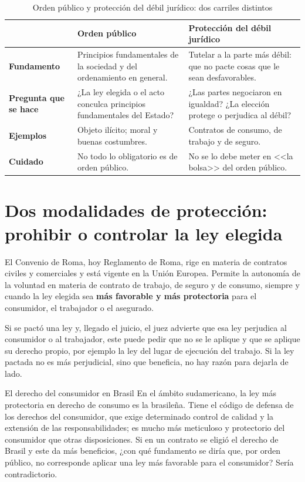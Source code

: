 \documentclass[12pt,oneside]{book}
\begin{document}
\begin{table}[H]
\centering
\caption{Orden p\'ublico y protecci\'on del d\'ebil jur\'idico: dos carriles distintos}
\small
\begin{tabularx}{\textwidth}{
    >{\raggedright\arraybackslash}p{}
    >{\raggedright\arraybackslash}X
    >{\raggedright\arraybackslash}X
}
\toprule
 & \textbf{Orden p\'ublico} & \textbf{Protecci\'on del d\'ebil jur\'idico} \\
\midrule
\textbf{Fundamento} & Principios fundamentales de la sociedad y del ordenamiento en general. & Tutelar a la parte m\'as d\'ebil: que no pacte cosas que le sean desfavorables. \\
\addlinespace
\textbf{Pregunta que se hace} & ¿La ley elegida o el acto conculca principios fundamentales del Estado? & ¿Las partes negociaron en igualdad? ¿La elecci\'on protege o perjudica al d\'ebil? \\
\addlinespace
\textbf{Ejemplos} & Objeto il\'icito; moral y buenas costumbres. & Contratos de consumo, de trabajo y de seguro. \\
\addlinespace
\textbf{Cuidado} & No todo lo obligatorio es de orden p\'ublico. & No se lo debe meter en <<la bolsa>> del orden p\'ublico. \\
\bottomrule
\end{tabularx}
\end{table}

\section{Dos modalidades de protecci\'on: prohibir o controlar la ley elegida}

El Convenio de Roma, hoy Reglamento de Roma, rige en materia de contratos civiles y comerciales y est\'a vigente en la Uni\'on Europea. Permite la autonom\'ia de la voluntad en materia de contrato de trabajo, de seguro y de consumo, siempre y cuando la ley elegida sea \textbf{m\'as favorable y m\'as protectoria} para el consumidor, el trabajador o el asegurado.

Si se pact\'o una ley y, llegado el juicio, el juez advierte que esa ley perjudica al consumidor o al trabajador, este puede pedir que no se le aplique y que se aplique su derecho propio, por ejemplo la ley del lugar de ejecuci\'on del trabajo. Si la ley pactada no es m\'as perjudicial, sino que beneficia, no hay raz\'on para dejarla de lado.

\begin{example}{El derecho del consumidor en Brasil}
En el \'ambito sudamericano, la ley m\'as protectoria en derecho de consumo es la brasile\~na. Tiene el c\'odigo de defensa de los derechos del consumidor, que exige determinado control de calidad y la extensi\'on de las responsabilidades; es mucho m\'as meticuloso y protectorio del consumidor que otras disposiciones. Si en un contrato se eligi\'o el derecho de Brasil y este da m\'as beneficios, ¿con qu\'e fundamento se dir\'ia que, por orden p\'ublico, no corresponde aplicar una ley m\'as favorable para el consumidor? Ser\'ia contradictorio.
\end{example}
\end{document}
